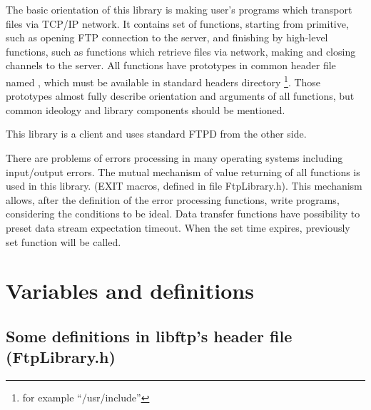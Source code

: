 The basic orientation of this library is making user's programs which transport
files via TCP/IP network. It contains set of functions, 
starting from primitive, such as opening FTP connection to the server, 
and finishing by high-level functions, such as functions which retrieve files
 via network, making and closing channels to the server. All functions have 
prototypes in common header file named , 
which must be 
available in standard headers directory
\footnote{for example ``/usr/include''}.
Those prototypes almost fully 
describe orientation and arguments of all functions, 
but common ideology and library components should be mentioned. 

This library is a client and uses standard FTPD from the other side.

There are problems of errors processing in many operating systems including input/output errors. 
The mutual mechanism of value returning of all functions is used in this library.
(EXIT macros, defined in file FtpLibrary.h). This mechanism allows,
 after the definition of the error processing functions, write programs, 
considering the conditions to be ideal.
Data transfer functions have possibility to preset data stream 
expectation timeout.
When the set time expires, previously set function will be called.

\section{Variables and definitions} 

\subsection{Some definitions in libftp's header file (FtpLibrary.h)}







